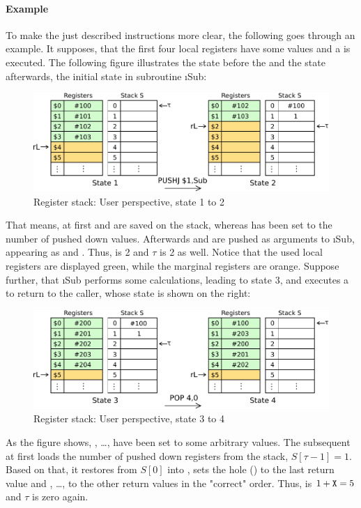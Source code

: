 \paragraph{Example}

To make the just described instructions more clear, the following goes through an example. It supposes, that the first four local registers have some values and a  is executed. The following figure illustrates the state before the  and the state afterwards, \ie the initial state in subroutine \i{Sub}:
\begin{figure}[H]
	\centering
	\includegraphics[width=\textwidth]{img/push-pop-user1-crop.pdf}
	\caption{Register stack: User perspective, state 1 to 2}
	\label{figure:push-pop-user1}
\end{figure}
\noindent That means, at first  and  are saved on the stack, whereas  has been set to the number of pushed down values. Afterwards  and  are pushed as arguments to \i{Sub}, appearing as  and . Thus,  is 2 and $\tau$ is 2 as well. Notice that the used local registers are displayed green, while the marginal registers are orange.
Suppose further, that \i{Sub} performs some calculations, leading to state 3, and executes a  to return to the caller, whose state is shown on the right:
\begin{figure}[H]
	\centering
	\includegraphics[width=\textwidth]{img/push-pop-user2-crop.pdf}
	\caption{Register stack: User perspective, state 3 to 4}
	\label{figure:push-pop-user2}
\end{figure}
\noindent As the figure shows, , \dots,  have been set to some arbitrary values. The subsequent  at first loads the number of pushed down registers from the stack, \ie $S[\tau - 1] = 1$. Based on that, it restores  from $S[0]$ into , sets the hole () to the last return value  and , \dots,  to the other return values in the "correct" order. Thus,  is $1+{\tt X} = 5$ and $\tau$ is zero again.

